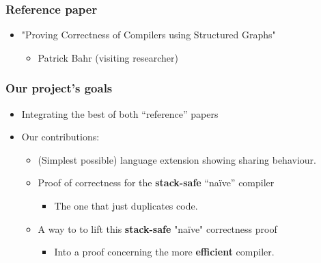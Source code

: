         \begin{frame}
            \frametitle{Reference paper}

            \begin{itemize}
                \item "Proving Correctness of Compilers using Structured Graphs"
                    \begin{itemize}
                        \item Patrick Bahr (visiting researcher)
                    \end{itemize}
            \end{itemize}
        \end{frame}

        \begin{frame}
            \frametitle{Our project's goals}

            \begin{itemize}
                \item Integrating the best of both ``reference'' papers

                \item Our contributions:
                \begin{itemize}
                    \item (Simplest possible) language extension showing sharing behaviour.

                    \item Proof of correctness for the \textbf{stack-safe} ``naïve'' compiler
                        \begin{itemize}
                            \item The one that just duplicates code.
                        \end{itemize}

                    \item A way to to lift this \textbf{stack-safe} "naïve" correctness proof
                        \begin{itemize}
                            \item Into a proof concerning the more \textbf{efficient} compiler.
                        \end{itemize}
                \end{itemize}
            \end{itemize}
        \end{frame}
